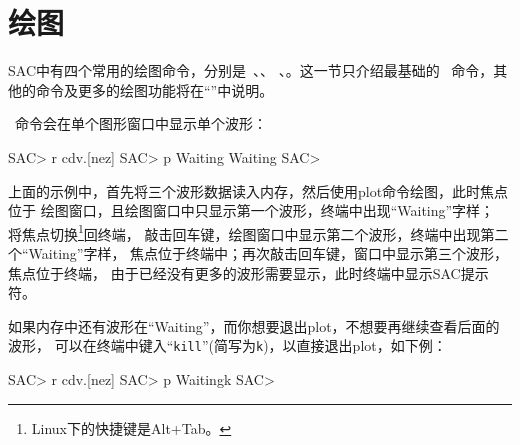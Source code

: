 \section{绘图}
\label{sec:display}

SAC中有四个常用的绘图命令，分别是~、、
、。这一节只介绍最基础的~
命令，其他的命令及更多的绘图功能将在``''中说明。

~命令会在单个图形窗口中显示单个波形：
\begin{SACCode}
SAC> r cdv.[nez]
SAC> p
Waiting
Waiting
SAC>
\end{SACCode}

上面的示例中，首先将三个波形数据读入内存，然后使用plot命令绘图，此时焦点位于
绘图窗口，且绘图窗口中只显示第一个波形，终端中出现``Waiting''字样；
将焦点切换\footnote{Linux下的快捷键是Alt+Tab。}回终端，
敲击回车键，绘图窗口中显示第二个波形，终端中出现第二个``Waiting''字样，
焦点位于终端中；再次敲击回车键，窗口中显示第三个波形，焦点位于终端，
由于已经没有更多的波形需要显示，此时终端中显示SAC提示符。

如果内存中还有波形在``Waiting''，而你想要退出plot，不想要再继续查看后面的波形，
可以在终端中键入``\verb+kill+''(简写为\verb+k+)，以直接退出plot，如下例：
\begin{SACCode}
SAC> r cdv.[nez]
SAC> p
Waitingk
SAC>
\end{SACCode}
